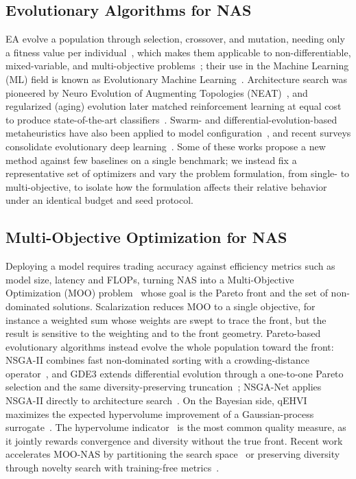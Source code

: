 \documentclass[runningheads]{llncs}
\begin{document}
\subsection{Evolutionary Algorithms for NAS} \label{SEC2.2}
EA evolve a population through selection, crossover, and mutation, needing only a fitness value per individual~\cite{eiben2015ec}, which makes them applicable to non-differentiable, mixed-variable, and multi-objective problems~\cite{jiao2024multiobjective}; their use in the Machine Learning (ML) field is known as Evolutionary Machine Learning~\cite{alsahaf2019eml,telikani2021eml}. Architecture search was pioneered by 
Neuro Evolution of Augmenting Topologies (NEAT)~\cite{stanley2002neat}, and regularized (aging) evolution later matched reinforcement learning at equal cost to produce state-of-the-art classifiers~\cite{real2019amoebanet}. Swarm- and differential-evolution-based metaheuristics have also been applied to model configuration~\cite{mohakud2020survey,raiaan2024hpo}, and recent surveys consolidate evolutionary deep learning~\cite{li2022evodl,zhou2021survey}. Some of these works propose a new method against few baselines on a single benchmark; we instead fix a representative set of optimizers and vary the problem formulation, from single- to multi-objective, to isolate how the formulation affects their relative behavior under an identical budget and seed protocol.



%
%
\subsection{Multi-Objective Optimization for NAS} \label{SEC2.3}
Deploying a model requires trading accuracy against efficiency metrics such as model size, latency and FLOPs, turning NAS into a Multi-Objective Optimization (MOO) problem~\cite{zhao2024lamoo} whose goal is the Pareto front and the set of non-dominated solutions. Scalarization reduces MOO to a single objective, for instance a weighted sum whose weights are swept to trace the front, but the result is sensitive to the weighting and to the front geometry. Pareto-based evolutionary algorithms instead evolve the whole population toward the front: NSGA-II combines fast non-dominated sorting with a crowding-distance operator~\cite{deb2002nsga2}, and GDE3 extends differential evolution through a one-to-one Pareto selection and the same diversity-preserving truncation~\cite{kukkonen2005gde3}; NSGA-Net applies NSGA-II directly to architecture search~\cite{lu2019nsganet}. On the Bayesian side, qEHVI maximizes the expected hypervolume improvement of a Gaussian-process surrogate~\cite{daulton2020qehvi}. The hypervolume indicator~\cite{zitzler1999hv} is the most common quality measure, as it jointly rewards convergence and diversity without the true front. Recent work accelerates MOO-NAS by partitioning the search space~\cite{zhao2024lamoo} or preserving diversity through novelty search with training-free metrics~\cite{vo2024pdns}.
\end{document}
